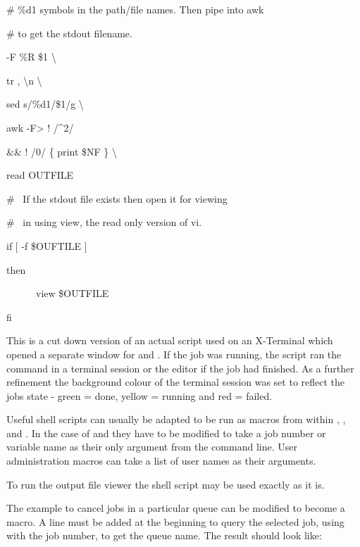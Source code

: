 \begin{itemize}
\begin{exparasmall}
\# \%d1 symbols in the path/file names. Then pipe into awk

\# to get the stdout filename.

\bigskip


\BtjlistName{} -F {\textquotedbl}\%R{\textquotedbl} \$1 {\textbar} {\textbackslash}

tr {\textquotedbl},{\textquotedbl} {\textquotedbl}{\textbackslash}n{\textquotedbl} {\textbar} {\textbackslash}

sed s/\%d1/\$1/g {\textbar} {\textbackslash}

awk -F{\textquotedbl}{\textgreater}{\textquotedbl} {\textquotesingle} ! /\^{}2/

\&\& ! /0/ \{ print \$NF \} {\textquotesingle} {\textbackslash}

read OUTFILE

\bigskip


\# \ If the stdout file exists then open it for viewing

\# \ in using view, the read only version of vi.

\bigskip

if [ -f {\textquotedbl}\$OUFTILE{\textquotedbl} ]

then

\ \ \ \ \ \ view \$OUTFILE

fi

\end{exparasmall}

This is a cut down version of an actual script used on an X-Terminal which opened a separate window for  and
. If the job was running, the script ran the  command in a terminal session or the
 editor if the job had finished. As a further refinement the background colour of the terminal session was set to
reflect the jobs state - green = done, yellow = running and red = failed.
\end{itemize}
Useful shell scripts can usually be adapted to be run as macros from within \PrBtq{}, \PrXmbtq{},
\PrBtuser{} and \PrXmbtuser{}. In the case of \PrBtq{} and \PrXmbtq{} they have to be modified to take a job number or variable name as their
only argument from the command line. User administration macros can take a list of user names as their arguments.

To run the output file viewer the shell script may be used exactly as it is.

The example to cancel jobs in a particular queue can be modified to become a macro. A line must be added at the beginning to query the
selected job, using \PrBtjlist{} with the job number, to get the queue name. The result should look like:

